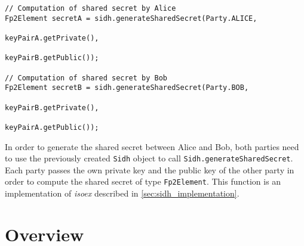 \begin{lstlisting}[]
// Computation of shared secret by Alice
Fp2Element secretA = sidh.generateSharedSecret(Party.ALICE,
													keyPairA.getPrivate(), 
													keyPairB.getPublic());

// Computation of shared secret by Bob
Fp2Element secretB = sidh.generateSharedSecret(Party.BOB, 
													keyPairB.getPrivate(), 
													keyPairA.getPublic());
\end{lstlisting}
In order to generate the shared secret between Alice and Bob, both parties need to use the previously created \texttt{Sidh} object to call \texttt{Sidh.generateSharedSecret}. Each party passes the own private key and the public key of the other party in order to compute the shared secret of type \texttt{Fp2Element}. This function is an implementation of \textit{isoex} described in \autoref{sec:sidh_implementation}.\\

\section{Overview}

